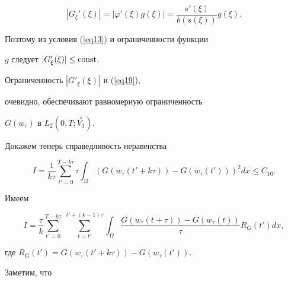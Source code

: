 $$


|G_{\xi}'(\xi)| = |\varphi'(\xi) g(\xi)| = \frac{s'(\xi)}{b(s(\xi))}


g(\xi).


$$


Поэтому из условия (\ref{eq13}) и ограниченности функции


$g$ следует $|G'_{\xi}(\xi)| \leq \operatorname{const}$.


Ограниченность $|G'_{\xi}(\xi)|$ и (\ref{eq19}),


очевидно, обеспечивают равномерную ограниченность


$G(w_{\tau})$ в $L_{2}(0,T;\overset{\circ}{V_{1}})$.





Докажем теперь справедливость неравенства


\begin{equation}


I = \frac{1}{k \tau} \sum_{t'=0}^{T- k \tau} \tau \int


_{\Omega}(G(w_{\tau}(t'+k \tau))-G(w_{\tau}(t')))^{2} dx \leq C_{10}.


\label{eq30}


\end{equation}


Имеем


$$


I=\frac{\tau}{k} \sum_{t'=0}^{T- k \tau} \;


\sum_{t=t'}^{t'+ (k-1) \tau}


\int_{\Omega} 


\frac{G(w_{\tau}(t+ \tau))-G(w_{\tau}(t))}{\tau} R_{G}(t') dx,


$$


где $R_{G}(t')=G(w_{\tau}(t'+k \tau)) - G(w_{\tau}(t'))$.


Заметим, что


